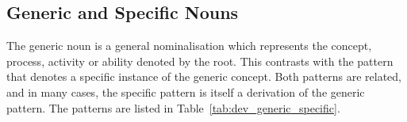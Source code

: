\documentclass[grammar]{subfiles}
\begin{document}
	\ToBeWritten

	\subsection{Generic and Specific Nouns}
	\label{ssec:dev_generic_nouns}

	The generic noun is a general nominalisation which represents the concept, process, activity or ability denoted by the root. This contrasts with the pattern that denotes a specific instance of the generic concept. Both patterns are related, and in many cases, the specific pattern is itself a derivation of the generic pattern. The patterns are listed in Table~\ref{tab:dev_generic_specific}.

	\begin{table}
		\begin{center}
			\\
\end{center}
\end{table}
\end{document}
